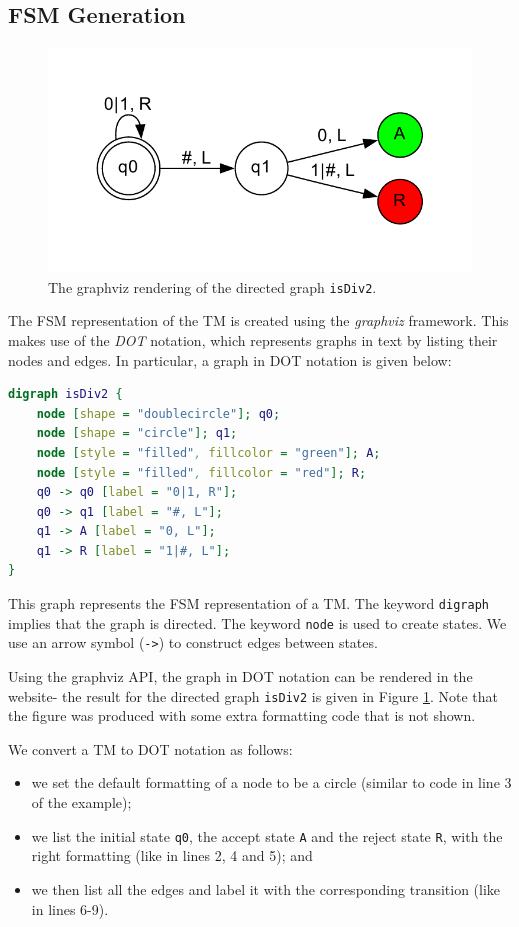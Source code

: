 \subsection{FSM Generation}
\begin{figure}[htb]
    \centering
    \includegraphics[scale=0.7]{images/graphviz_isDiv2.pdf}
    \caption{The graphviz rendering of the directed graph \texttt{isDiv2}.}
    \label{fig:graphviz_isDiv2}
\end{figure}

The FSM representation of the TM is created using the \emph{graphviz} framework. This makes use of the \emph{DOT} notation, which represents graphs in text by listing their nodes and edges. In particular, a graph in DOT notation is given below:
\begin{lstlisting}[language=DOT]
digraph isDiv2 {
    node [shape = "doublecircle"]; q0;
    node [shape = "circle"]; q1;
    node [style = "filled", fillcolor = "green"]; A;
    node [style = "filled", fillcolor = "red"]; R;
    q0 -> q0 [label = "0|1, R"];
    q0 -> q1 [label = "#, L"];
    q1 -> A [label = "0, L"];
    q1 -> R [label = "1|#, L"];
}
\end{lstlisting}
This graph represents the FSM representation of a TM. The keyword \texttt{digraph} implies that the graph is directed. The keyword \texttt{node} is used to create states. We use an arrow symbol (\texttt{->}) to construct edges between states.

Using the graphviz API, the graph in DOT notation can be rendered in the website- the result for the directed graph \texttt{isDiv2} is given in Figure \ref{fig:graphviz_isDiv2}. Note that the figure was produced with some extra formatting code that is not shown.

We convert a TM to DOT notation as follows:
\begin{itemize}
    \item we set the default formatting of a node to be a circle (similar to code in line 3 of the example);
    \item we list the initial state \texttt{q0}, the accept state \texttt{A} and the reject state \texttt{R}, with the right formatting (like in lines 2, 4 and 5); and 
    \item we then list all the edges and label it with the corresponding transition (like in lines 6-9).
\end{itemize}

